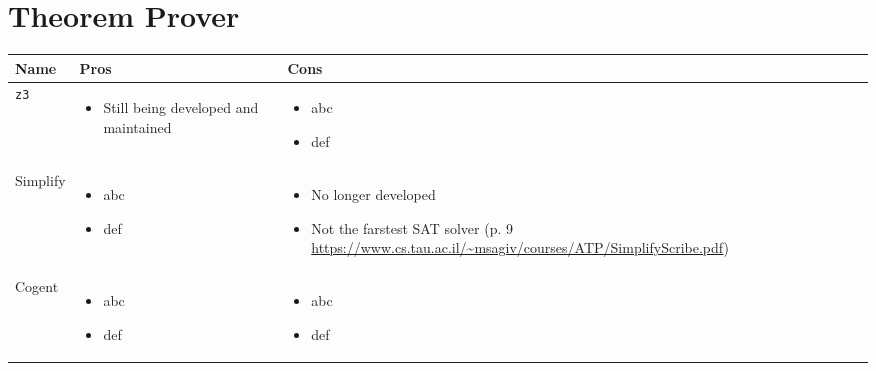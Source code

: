 
\section{Theorem Prover \ms} \label{sec:z3}

\begin{table*}[h!]
    \centering
    \begin{tabular}{|l|p{5cm}|p{5cm}|}
        \hline
        Name & Pros & Cons
        \\ \hline
        \texttt{z3} &
        \begin{itemize}[left=0pt,topsep=0pt]
            \item Still being developed and maintained
        \end{itemize}\nointerlineskip
        &
        \begin{itemize}[left=0pt,topsep=0pt]
            \item abc
            \item def
        \end{itemize}\nointerlineskip
        \\ \hline
        Simplify &
        \begin{itemize}[left=0pt,topsep=0pt]
            \item abc
            \item def
        \end{itemize}\nointerlineskip
        &
        \begin{itemize}[left=0pt,topsep=0pt]
            \item No longer developed
            \item Not the farstest SAT solver (p. 9 \url{https://www.cs.tau.ac.il/~msagiv/courses/ATP/SimplifyScribe.pdf})
        \end{itemize}\nointerlineskip
        \\ \hline
        Cogent &
        \begin{itemize}[left=0pt,topsep=0pt]
            \item abc
            \item def
        \end{itemize}\nointerlineskip
        &
        \begin{itemize}[left=0pt,topsep=0pt]
            \item abc
            \item def
        \end{itemize}\nointerlineskip
        \\ \hline
        \end{tabular}
\end{table*}

